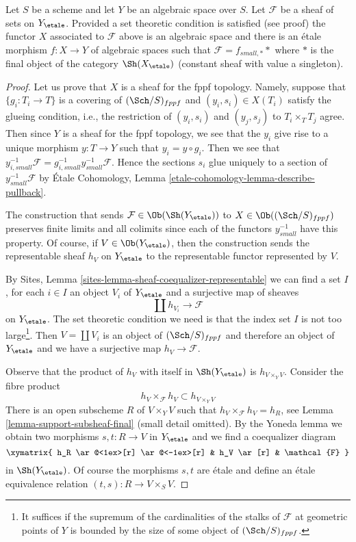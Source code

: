 \begin{lemma}
\label{lemma-sheaf-gives-space}
Let $S$ be a scheme and let $Y$ be an algebraic space over $S$.
Let $\mathcal{F}$ be a sheaf of sets on $Y_\etale$.
Provided a set theoretic condition is satisfied (see proof)
the functor $X$ associated to $\mathcal{F}$ above is an algebraic space
and there is an \'etale morphism $f : X \to Y$ of algebraic spaces
such that $\mathcal{F} = f_{small, *}*$ where $*$ is the final object
of the category $\Sh(X_\etale)$ (constant sheaf with value a singleton).
\end{lemma}

\begin{proof}
Let us prove that $X$ is a sheaf for the fppf topology. Namely, suppose
that $\{g_i : T_i \to T\}$ is a covering of $(\Sch/S)_{fppf}$ and
$(y_i, s_i) \in X(T_i)$ satisfy the glueing condition, i.e., the
restriction of $(y_i, s_i)$ and $(y_j, s_j)$ to $T_i \times_T T_j$ agree.
Then since $Y$ is a sheaf for the fppf topology, we see that
the $y_i$ give rise to a unique morphism $y : T \to Y$ such that
$y_i = y \circ g_i$. Then we see that
$y_{i, small}^{-1}\mathcal{F} = g_{i, small}^{-1}y_{small}^{-1}\mathcal{F}$.
Hence the sections $s_i$ glue uniquely to a section of
$y_{small}^{-1}\mathcal{F}$ by
\'Etale Cohomology, Lemma \ref{etale-cohomology-lemma-describe-pullback}.

\medskip\noindent
The construction that sends $\mathcal{F} \in \Ob(\Sh(Y_\etale))$
to $X \in \Ob((\Sch/S)_{fppf})$ preserves finite limits and
all colimits since each of the functors $y_{small}^{-1}$ have
this property. Of course, if $V \in \Ob(Y_\etale)$, then
the construction sends the representable sheaf $h_V$ on $Y_\etale$
to the representable functor represented by $V$.

\medskip\noindent
By Sites, Lemma \ref{sites-lemma-sheaf-coequalizer-representable}
we can find a set $I$, for each $i \in I$ an object $V_i$ of $Y_\etale$
and a surjective map of sheaves
$$
\coprod h_{V_i} \longrightarrow \mathcal{F}
$$
on $Y_\etale$. The set theoretic condition we need is that the index
set $I$ is not too large\footnote{It suffices if the supremum of the
cardinalities of the stalks of $\mathcal{F}$ at geometric points of $Y$
is bounded by the size of some object of $(\Sch/S)_{fppf}$.}.
Then $V = \coprod V_i$ is an object of $(\Sch/S)_{fppf}$ and
therefore an object of $Y_\etale$ and we have a surjective map
$h_V \to \mathcal{F}$.

\medskip\noindent
Observe that the product of $h_V$ with itself in $\Sh(Y_\etale)$
is $h_{V \times_Y V}$. Consider the fibre product
$$
h_V \times_\mathcal{F} h_V \subset h_{V \times_Y V}
$$
There is an open subscheme $R$ of $V \times_Y V$ such that
$h_V \times_\mathcal{F} h_V = h_R$, see
Lemma \ref{lemma-support-subsheaf-final} (small detail omitted).
By the Yoneda lemma we obtain two morphisms $s, t : R \to V$ in $Y_\etale$
and we find a coequalizer diagram
$$
\xymatrix{
h_R \ar@<1ex>[r] \ar@<-1ex>[r] &
h_V \ar[r] &
\mathcal{F}
}
$$
in $\Sh(Y_\etale)$. Of course the morphisms $s, t$ are \'etale
and define an \'etale equivalence relation $(t, s) : R \to V \times_S V$.


\end{proof}
